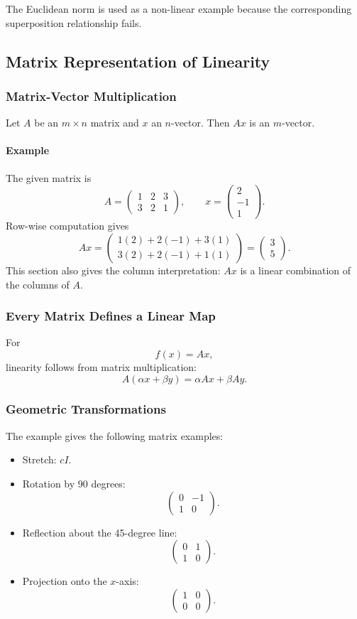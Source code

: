 \documentclass[12pt]{article}
\newcommand{\Example}{\paragraph{Example}}
\begin{document}
The Euclidean norm is used as a non-linear example because the corresponding superposition relationship fails.

\subsection{Matrix Representation of Linearity}
\subsubsection{Matrix-Vector Multiplication}
Let $A$ be an $m\times n$ matrix and $x$ an $n$-vector. Then $Ax$ is an $m$-vector.

\Example The given matrix is
\[
A=\begin{pmatrix}1&2&3\\3&2&1\end{pmatrix},\qquad
x=\begin{pmatrix}2\\-1\\1\end{pmatrix}.
\]
Row-wise computation gives
\[
Ax=\begin{pmatrix}1(2)+2(-1)+3(1)\\3(2)+2(-1)+1(1)\end{pmatrix}
=\begin{pmatrix}3\\5\end{pmatrix}.
\]
This section also gives the column interpretation: $Ax$ is a linear combination of the columns of $A$.

\subsubsection{Every Matrix Defines a Linear Map}
For
\[
f(x)=Ax,
\]
linearity follows from matrix multiplication:
\[
A(\alpha x+\beta y)=\alpha Ax+\beta Ay.
\]

\subsubsection{Geometric Transformations}
The example gives the following matrix examples:
\begin{itemize}
    \item Stretch: $cI$.
    \item Rotation by 90 degrees:
    \[
    \begin{pmatrix}0&-1\\1&0\end{pmatrix}.
    \]
    \item Reflection about the 45-degree line:
    \[
    \begin{pmatrix}0&1\\1&0\end{pmatrix}.
    \]
    \item Projection onto the $x$-axis:
    \[
    \begin{pmatrix}1&0\\0&0\end{pmatrix}.
    \]
\end{itemize}
\end{document}
